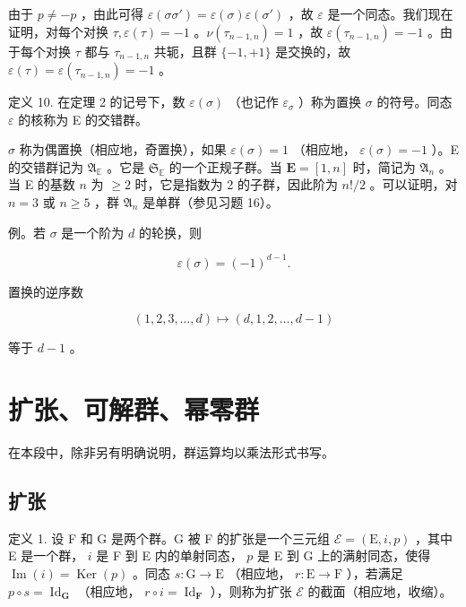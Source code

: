 由于 \(p \neq -p\) ，由此可得 \(\varepsilon(\sigma\sigma') = \varepsilon(\sigma)\varepsilon(\sigma')\) ，故 \(\varepsilon\) 是一个同态。我们现在证明，对每个对换 \(\tau, \varepsilon(\tau) = -1\) 。\(\nu(\tau_{n-1,n}) = 1\) ，故 \(\varepsilon(\tau_{n-1,n}) = -1\) 。由于每个对换 \(\tau\) 都与 \(\tau_{n-1,n}\) 共轭，且群 \(\{-1, +1\}\) 是交换的，故 \(\varepsilon(\tau) = \varepsilon(\tau_{n-1,n}) = -1\) 。

定义 10. 在定理 2 的记号下，数 \(\varepsilon(\sigma)\) （也记作 \(\varepsilon_{\sigma}\) ）称为置换 \(\sigma\) 的符号。同态 \(\varepsilon\) 的核称为 E 的交错群。

\(\sigma\) 称为偶置换（相应地，奇置换），如果 \(\varepsilon(\sigma) = 1\) （相应地， \(\varepsilon(\sigma) = -1\) ）。E 的交错群记为 \(\mathfrak{A}_{\mathbb{E}}\) 。它是 \(\mathfrak{S}_{\mathbb{E}}\) 的一个正规子群。当 \(\mathbf{E} = [1, n]\) 时，简记为 \(\mathfrak{A}_{n}\) 。当 E 的基数 \(n\) 为 \(\geqslant 2\) 时，它是指数为 2 的子群，因此阶为 \(n! / 2\) 。可以证明，对 \(n = 3\) 或 \(n \geqslant 5\) ，群 \(\mathfrak{A}_{n}\) 是单群（参见习题 16）。

例。若 \(\sigma\) 是一个阶为 \(d\) 的轮换，则

\[
\varepsilon (\sigma) = (- 1) ^ {d - 1}.
\]

置换的逆序数

\[
(1, 2, 3, \dots , d) \mapsto (d, 1, 2, \dots , d - 1)
\]

等于 \(d - 1\) 。

\section{扩张、可解群、幂零群}

在本段中，除非另有明确说明，群运算均以乘法形式书写。

\subsection{扩张}

定义 1. 设 F 和 G 是两个群。G 被 F 的扩张是一个三元组 \(\mathcal{E} = (\mathrm{E}, i, p)\) ，其中 E 是一个群， \(i\) 是 F 到 E 内的单射同态， \(p\) 是 E 到 G 上的满射同态，使得 \(\operatorname{Im}(i) = \operatorname{Ker}(p)\) 。同态 \(s: \mathrm{G} \to \mathrm{E}\) （相应地， \(r: \mathrm{E} \to \mathrm{F}\) ），若满足 \(p \circ s = \operatorname{Id}_{\mathbf{G}}\) （相应地， \(r \circ i = \operatorname{Id}_{\mathbf{F}}\) ），则称为扩张 \(\mathcal{E}\) 的截面（相应地，收缩）。

